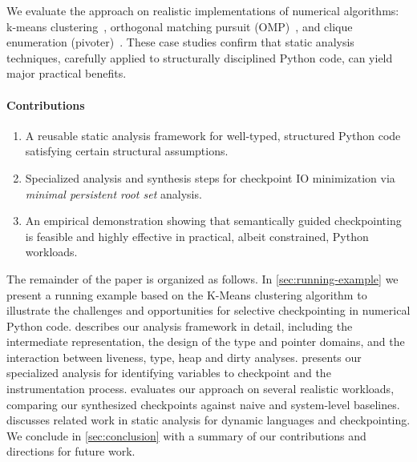 We evaluate the approach on realistic implementations of numerical algorithms: k-means clustering~\cite{macqueen1967multivariate}, orthogonal matching pursuit (OMP)~\cite{Pati1993OMP}, and clique enumeration (pivoter)~\cite{jain2020power}. These case studies confirm that static analysis techniques, carefully applied to structurally disciplined Python code, can yield major practical benefits.


\paragraph{Contributions}
\begin{enumerate}
\item A reusable static analysis framework for well-typed, structured Python code satisfying certain structural assumptions.
\item Specialized analysis and synthesis steps for checkpoint IO minimization via \emph{minimal persistent root set} analysis.
\item An empirical demonstration showing that semantically guided checkpointing is feasible and highly effective in practical, albeit constrained, Python workloads.
\end{enumerate}

The remainder of the paper is organized as follows. In \cref{sec:running-example} we present a running example based on the K-Means clustering algorithm to illustrate the challenges and opportunities for selective checkpointing in numerical Python code.  describes our analysis framework in detail, including the intermediate representation, the design of the type and pointer domains, and the interaction between liveness, type, heap and dirty analyses.  presents our specialized analysis for identifying variables to checkpoint and the instrumentation process.  evaluates our approach on several realistic workloads, comparing our synthesized checkpoints against naive and system-level baselines.  discusses related work in static analysis for dynamic languages and checkpointing. We conclude in \cref{sec:conclusion} with a summary of our contributions and directions for future work.
